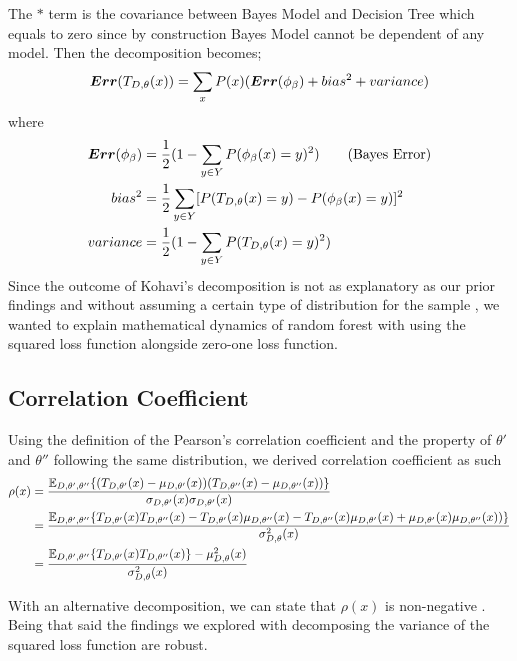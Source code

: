 The $*$ term is the covariance between Bayes Model and Decision Tree which equals to zero since by construction Bayes Model cannot be dependent of any model. Then the decomposition becomes;
\begin{align}
\boldsymbol{Err}(T_{D, \theta}(x)) = \sum_{x} P(x)(\boldsymbol{Err}(\phi_{\beta}) + bias^2 + variance) \notag
\end{align}
where
\begin{align}
\boldsymbol{Err}(\phi_{\beta}) & = \dfrac{1}{2}(1 - \sum_{y \in Y}P(\phi_{\beta}(x) = y)^2)\tag{Bayes Error} \\
bias^2 & = \dfrac{1}{2}\sum_{y \in Y} [P(T_{D,\theta}(x)=y) - P(\phi_{\beta}(x) = y)]^2\notag \\
variance & = \dfrac{1}{2}(1 - \sum_{y \in Y}P(T_{D, \theta}(x) = y)^2) \notag
\end{align}
Since the outcome of Kohavi's decomposition is not as explanatory as our prior findings and without assuming a certain type of distribution for the sample \cite{louppe2014understanding}, we wanted to explain mathematical dynamics of random forest with using the squared loss function alongside zero-one loss function.

\subsection{Correlation Coefficient}
\label{app:corr_coef}
Using the definition of the Pearson's correlation coefficient and the property of $\theta'$ and $\theta''$ following the same distribution, we derived correlation coefficient as such
\begin{align}
\rho(x) & = \dfrac{\mathbb{E}_{D,\theta',\theta''}\{(T_{D,\theta'}(x) - \mu_{D,\theta'}(x))(T_{D,\theta''}(x) - \mu_{D,\theta''}(x))\} }				{\sigma_{D,\theta'}(x)\sigma_{D,\theta'}(x)}\notag \\
		& = \dfrac{\mathbb{E}_{D,\theta',\theta''}\{T_{D,\theta'}(x)T_{D,\theta''}(x) - T_{D,\theta'}(x)\mu_{D,\theta''}(x) - T_{D,								\theta''}(x)\mu_{D,\theta'}(x) + \mu_{D,\theta'}(x)\mu_{D,\theta''}(x))\} }
				{\sigma_{D,\theta}^2(x)} \notag \\
		& = \dfrac{\mathbb{E}_{D,\theta',\theta''}\{T_{D,\theta'}(x) T_{D,\theta''}(x)\} - \mu_{D,\theta}^2(x)}{\sigma_{D,\theta}^2(x)}\notag
\end{align}

With an alternative decomposition, we can state that $\rho(x)$ is non-negative 
\cite{louppe2014understanding} \cite{geurts2002contributions}. 
Being that said the findings we explored with decomposing the variance of the squared loss function are robust.

